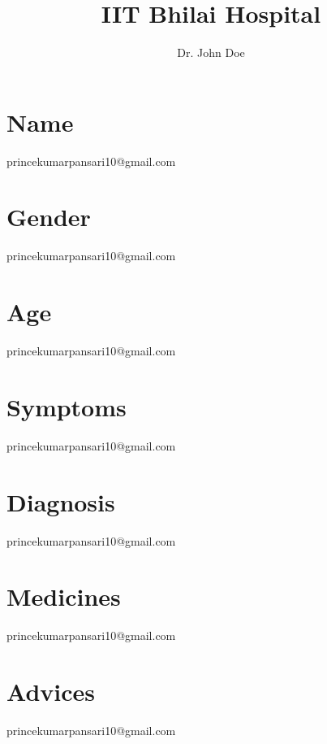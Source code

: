 \documentclass{article}
\begin{document}
    \title{IIT Bhilai Hospital}
    \author{Dr. John Doe}

    \maketitle
    \section*{Name}
princekumarpansari10@gmail.com
\section*{Gender}
princekumarpansari10@gmail.com
\section*{Age}
princekumarpansari10@gmail.com
\section*{Symptoms}
princekumarpansari10@gmail.com
\section*{Diagnosis}
princekumarpansari10@gmail.com
\section*{Medicines}
princekumarpansari10@gmail.com
\section*{Advices}
princekumarpansari10@gmail.com
\end{document}
